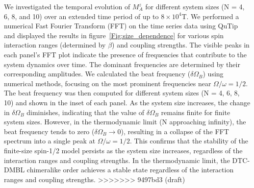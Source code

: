 \documentclass[12pt]{iopart}
\begin{document}
We investigated the temporal evolution of $M^z_A$ for different system sizes (N = 4, 6, 8, and 10) over an extended time period of up to $8\times10^4$T. We performed a numerical Fast Fourier Transform (FFT) on the time series data using QuTip~\cite{Johansson2013} and displayed the results in figure~\ref{Fig:size_dependence} for various spin interaction ranges (determined by $\beta$) and coupling strengths. The visible peaks in each panel's FFT plot indicate the presence of frequencies that contribute to the system dynamics over time. The dominant frequencies are determined by their corresponding amplitudes. We calculated the beat frequency ($\delta\Omega_B$) using numerical methods, focusing on the most prominent frequencies near $\Omega/\omega = 1/2$. The beat frequency was then computed for different system sizes (N = 4, 6, 8, 10) and shown in the inset of each panel. As the system size increases, the change in $\delta\Omega_B$ diminishes, indicating that the value of $\delta\Omega_B$ remains finite for finite system sizes. However, in the thermodynamic limit (N approaching infinity), the beat frequency tends to zero ($\delta\Omega_B\rightarrow 0$), resulting in a collapse of the FFT spectrum into a single peak at $\Omega/\omega = 1/2$. This confirms that the stability of the finite-size spin-1/2 model persists as the system size increases, regardless of the interaction ranges and coupling strengths. In the thermodynamic limit, the DTC-DMBL chimeralike order achieves a stable state regardless of the interaction ranges and coupling strengths.
>>>>>>> 9497bd3 (draft)
\end{document}
